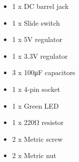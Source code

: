 \begin{itemize}
\itemsep1pt\parskip0pt
\item
  1 x DC barrel jack
\item
  1 x Slide switch
\item
  1 x 5V regulator
\item
  1 x 3.3V regulator
\item
  3 x 100μF capacitors
\item
  1 x 4-pin socket
\item
  1 x Green LED
\item
  1 x 220Ω resistor
\item
  2 x Metric screw
\item
  2 x Metric nut
\end{itemize}
